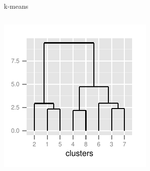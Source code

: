 \documentclass[xcolor=x11names,
								compress,
								aspectratio=1610]{beamer}
\theoremstyle{definition}%
\renewcommand{\(}{\begin{columns}}
\renewcommand{\)}{\end{columns}}
\newcommand{\<}[1]{\begin{column}{#1}}
\renewcommand{\>}{\end{column}}
\begin{document}
\begin{frame}{k-means}
\begin{columns}[onlytextwidth]
\begin{column}{.5\textwidth}
			\begin{center}
			\includegraphics{presence_complete_dendrogram_8means_clusts}
			\end{center}
		\end{column}
	\end{columns}
\end{frame}
\end{document}
